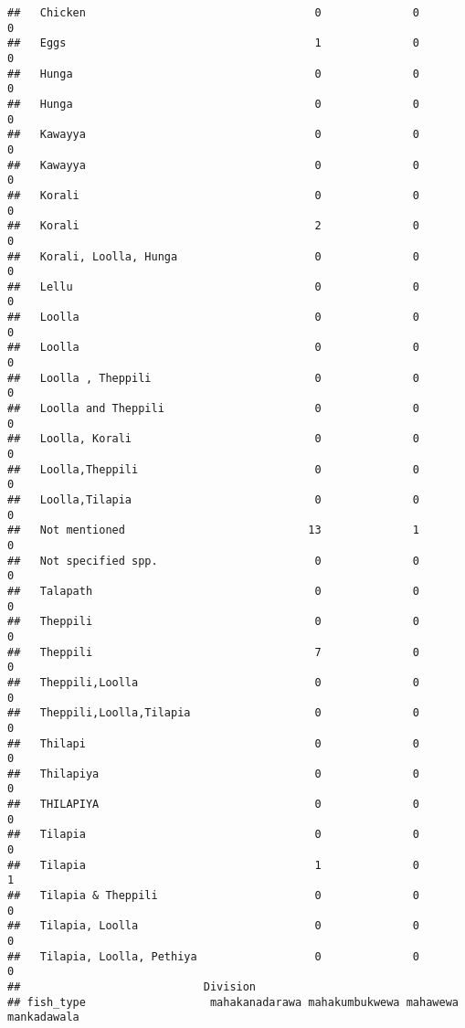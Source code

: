 \documentclass[
]{article}
\begin{document}
\begin{verbatim}
##   Chicken                                   0              0             0
##   Eggs                                      1              0             0
##   Hunga                                     0              0             0
##   Hunga                                     0              0             0
##   Kawayya                                   0              0             0
##   Kawayya                                   0              0             0
##   Korali                                    0              0             0
##   Korali                                    2              0             0
##   Korali, Loolla, Hunga                     0              0             0
##   Lellu                                     0              0             0
##   Loolla                                    0              0             0
##   Loolla                                    0              0             0
##   Loolla , Theppili                         0              0             0
##   Loolla and Theppili                       0              0             0
##   Loolla, Korali                            0              0             0
##   Loolla,Theppili                           0              0             0
##   Loolla,Tilapia                            0              0             0
##   Not mentioned                            13              1             0
##   Not specified spp.                        0              0             0
##   Talapath                                  0              0             0
##   Theppili                                  0              0             0
##   Theppili                                  7              0             0
##   Theppili,Loolla                           0              0             0
##   Theppili,Loolla,Tilapia                   0              0             0
##   Thilapi                                   0              0             0
##   Thilapiya                                 0              0             0
##   THILAPIYA                                 0              0             0
##   Tilapia                                   0              0             0
##   Tilapia                                   1              0             1
##   Tilapia & Theppili                        0              0             0
##   Tilapia, Loolla                           0              0             0
##   Tilapia, Loolla, Pethiya                  0              0             0
##                            Division
## fish_type                   mahakanadarawa mahakumbukwewa mahawewa mankadawala

\end{verbatim}
\end{document}
